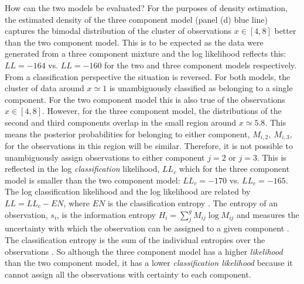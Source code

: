 How can the two models be evaluated?  For the purposes of density estimation, the estimated density of the three component model (panel (d) blue line) captures the bimodal distribution of the cluster of observations $x \in [4, 8]$ better than the two component model. This is to be expected as the data were generated from a three component mixture and the log likelihood reflects this: $LL=\num{-164}$ vs. $LL=\num{-160}$ for the two and three component models respectively. From a classification perspective the situation is reversed. For both models, the cluster of data around $x\simeq 1$ is unambiguously classified as belonging to a single component. For the two component model this is also true of the observations $x  \in [4, 8]$. However, for the three component model, the  distributions of the second and third components overlap in the small region around $x\simeq 5.8$. This means the posterior probabilities for belonging to either component, $M_{i, 2},\ M_{i, 3}$,  for the observations in this region will be similar. Therefore, it is not possible to unambiguously assign observations to either component $j=2$ or $j=3$. This is reflected in the log \emph{classification} likelihood, $LL_{c}$ which for the three component model is smaller than the two component model: $LL_{c}=\num{-170}$ vs. $LL_{c} = \num{-165}$. The log classification likelihood and the log likelihood are related by $LL = LL_{c} - EN$, where $EN$ is the classification entropy \cite{hathaway1986another}.  The entropy of an observation, $s_i$, is the information entropy  $H_i = \sum_{j}^{g}M_{ij}\log{M_{ij}}$  and measures the uncertainty with which the observation can be assigned to a given component \cite{mackay2003information}. The classification entropy is the sum of the individual entropies over the observations \cite{mclachlanFiniteMixtureModels2000}. So although the three component model has a higher \emph{likelihood} than the two component model, it has a lower \emph{classification likelihood} because it cannot assign all the observations with certainty to each component. 


